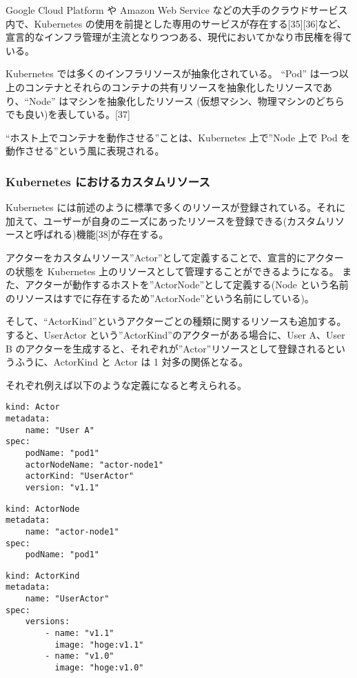Google Cloud Platform や Amazon Web Service
などの大手のクラウドサービス内で、Kubernetes
の使用を前提とした専用のサービスが存在する{[}35{]}{[}36{]}など、宣言的なインフラ管理が主流となりつつある、現代においてかなり市民権を得ている。

Kubernetes では多くのインフラリソースが抽象化されている。 ``Pod''
は一つ以上のコンテナとそれらのコンテナの共有リソースを抽象化したリソースであり、``Node''
はマシンを抽象化したリソース
(仮想マシン、物理マシンのどちらでも良い)を表している。{[}37{]}

``ホスト上でコンテナを動作させる''ことは、Kubernetes 上で''Node 上で Pod
を動作させる''という風に表現される。

\subsubsection{Kubernetes におけるカスタムリソース}

Kubernetes
には前述のように標準で多くのリソースが登録されている。それに加えて、ユーザーが自身のニーズにあったリソースを登録できる(カスタムリソースと呼ばれる)機能{[}38{]}が存在する。

アクターをカスタムリソース''Actor''として定義することで、宣言的にアクターの状態を
Kubernetes 上のリソースとして管理することができるようになる。
また、アクターが動作するホストを''ActorNode''として定義する(Node
という名前のリソースはすでに存在するため''ActorNode''という名前にしている)。

そして、``ActorKind''というアクターごとの種類に関するリソースも追加する。
すると、UserActor という''ActorKind''のアクターがある場合に、User
A、User B
のアクターを生成すると、それぞれが''Actor''リソースとして登録されるというふうに、ActorKind
と Actor は 1 対多の関係となる。

それぞれ例えば以下のような定義になると考えられる。

\begin{verbatim}
kind: Actor
metadata:
    name: "User A"
spec:
    podName: "pod1"
    actorNodeName: "actor-node1"
    actorKind: "UserActor"
    version: "v1.1"
\end{verbatim}

\begin{verbatim}
kind: ActorNode
metadata:
    name: "actor-node1"
spec:
    podName: "pod1"
\end{verbatim}

\begin{verbatim}
kind: ActorKind
metadata:
    name: "UserActor"
spec:
    versions:
        - name: "v1.1"
          image: "hoge:v1.1"
        - name: "v1.0"
          image: "hoge:v1.0"
\end{verbatim}


